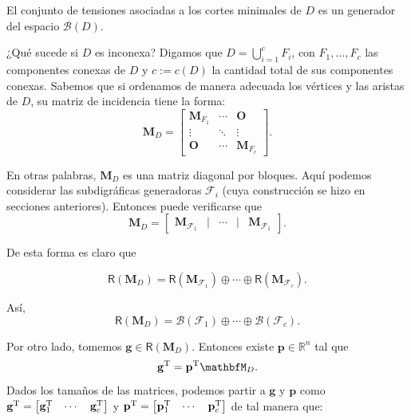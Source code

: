 \vspace{1cm}
\begin{cor}
El conjunto de tensiones asociadas a los cortes minimales de $D$ es un generador del espacio $\mathcal{B}(D)$.
\end{cor}

¿Qué sucede si $D$ es inconexa? Digamos que $D = \bigcup_{i=1}^{c}F_{i}$, con $F_{1}, \ldots, F_{c}$ las componentes conexas de $D$ y $c:=c(D)$ la cantidad total de sus componentes conexas. Sabemos que si ordenamos de manera adecuada los vértices y las aristas de $D$, su matriz de incidencia tiene la forma:
$$
\mathbf{M}_{D} = \begin{bmatrix}
\mathbf{M}_{F_{1}} & \cdots  & \mathbf{O} \\ 
\vdots & \ddots  & \vdots \\ 
\mathbf{O} & \cdots & \mathbf{M}_{F_{c}}
\end{bmatrix}.
$$

En otras palabras, $\mathbf{M}_{D}$ es una matriz diagonal por bloques. Aquí podemos considerar las subdigráficas generadoras $\mathcal{F}_{i}$ (cuya construcción se hizo en secciones anteriores). Entonces puede verificarse que 
$$
\mathbf{M}_{D} = \begin{bmatrix}
\mathbf{M}_{\mathcal{F}_{1}} &|& \cdots &|& \mathbf{M}_{\mathcal{F}_{1}}
\end{bmatrix}.
$$

De esta forma es claro que 

$$\mathsf{R}(\mathbf{M}_{D}) = \mathsf{R}(\mathbf{M}_{\mathcal{F}_{1}}) \oplus \cdots \oplus \mathsf{R}(\mathbf{M}_{\mathcal{F}_{c}}).$$

 Así, $$\mathsf{R}(\mathbf{M}_{D}) = \mathcal{B}(\mathcal{F}_{1}) \oplus \cdots \oplus \mathcal{B}(\mathcal{F}_{c}).$$

Por otro lado, tomemos $\mathbf{g} \in \mathsf{R}(\mathbf{M}_{D})$. Entonces existe $\mathbf{p} \in \mathbb{R}^{n}$ tal que $$\mathbf{g}^{\textnormal{T}} = \mathbf{p}^{\textnormal{T}}\mathbfM_{D}.$$ Dados los tamaños de las matrices, podemos partir a $\mathbf{g}$ y $\mathbf{p}$ como\\ $\mathbf{g}^{\textnormal{T}} = \begin{bmatrix}
\mathbf{g}_{1}^{\textnormal{T}} & \cdots  & \mathbf{g}_{c}^{\textnormal{T}} 
\end{bmatrix}$ y $\mathbf{p}^{\textnormal{T}} = \begin{bmatrix}
\mathbf{p}_{1}^{\textnormal{T}} & \cdots  & \mathbf{p}_{c}^{\textnormal{T}} 
\end{bmatrix}$ de tal manera que:

